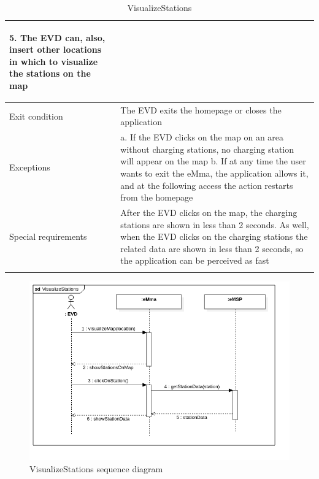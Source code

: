 \begin{center}
\begin{longtable}{p{4cm} p{11cm}}
\begin{adjustwidth}{0.5cm}{}
                    \end{adjustwidth}   
                    5. The EVD can, also, insert other locations in which to visualize the stations on the map
     \\
     \hline
     Exit condition & The EVD exits the homepage or closes the application \\
     \hline
     Exceptions &   a. If the EVD clicks on the map on an area without charging stations, no charging station will appear on the map \newline
                    b. If at any time the user wants to exit the eMma, the application allows it, and at the following access the action restarts from the homepage \\
     \hline
     Special requirements & After the EVD clicks on the map, the charging stations are shown in less than 2 seconds. As well, when the EVD clicks on the charging stations the related data are shown in less than 2 seconds, so the application can be perceived as fast \\
     \hline
    \caption{VisualizeStations}
    \label{tab:VisualizeStations}
    \end{longtable}
\end{center}
\begin{figure}[H]
    \centering
    \includegraphics[width=1\textwidth]{Images/cp3/seqDiagrams/VisualizeStations.png}
    \caption{VisualizeStations sequence diagram}
\end{figure}

\clearpage
